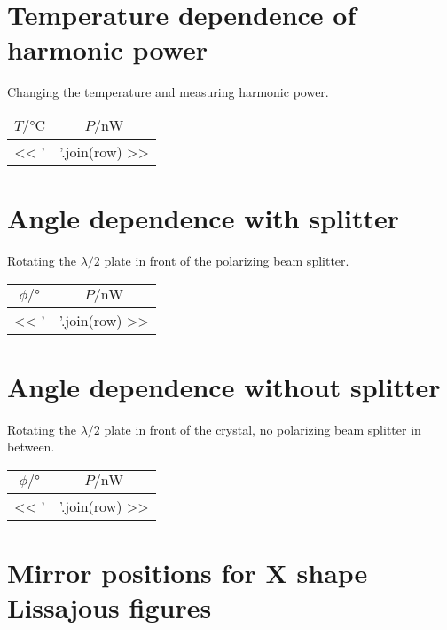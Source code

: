 \documentclass[11pt, english, fleqn, DIV=15, headinclude, BCOR=2cm]{scrreprt}
\begin{document}
\begin{appendix}
    \section{Temperature dependence of harmonic power}

    Changing the temperature and measuring harmonic power.

    \begin{longtable}[l]{SS}
        \toprule
        {$T/\si{\celsius}$}
        & {$P/\si{\nano\watt}$} \\
        \midrule
        \endhead
        << ' & '.join(row) >> \\
        \bottomrule
    \end{longtable}

    \section{Angle dependence with splitter}

    Rotating the $\lambda/2$ plate in front of the polarizing beam splitter.

    \begin{longtable}[l]{SS}
        \toprule
        {$\phi/\si{\degree}$}
        & {$P/\si{\nano\watt}$} \\
        \midrule
        \endhead
        << ' & '.join(row) >> \\
        \bottomrule
    \end{longtable}

    \section{Angle dependence without splitter}

    Rotating the $\lambda/2$ plate in front of the crystal, no polarizing beam
    splitter in between.

    \begin{longtable}[l]{SS}
        \toprule
        {$\phi/\si{\degree}$}
        & {$P/\si{\nano\watt}$} \\
        \midrule
        \endhead
        << ' & '.join(row) >> \\
        \bottomrule
    \end{longtable}

    \section{Mirror positions for X shape Lissajous figures}


\end{appendix}
\end{document}
